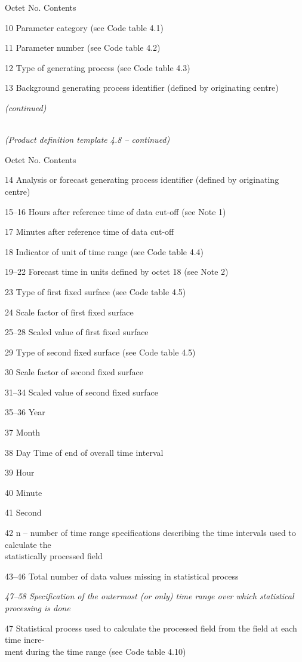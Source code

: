 Octet No. Contents

10 Parameter category (see Code table 4.1)

11 Parameter number (see Code table 4.2)

12 Type of generating process (see Code table 4.3)

13 Background generating process identifier (defined by originating centre)

\emph{(continued)}

\emph{\\
(Product definition template 4.8 -- continued)}

Octet No. Contents

14 Analysis or forecast generating process identifier (defined by originating centre)

15--16 Hours after reference time of data cut-off (see Note 1)

17 Minutes after reference time of data cut-off

18 Indicator of unit of time range (see Code table 4.4)

19--22 Forecast time in units defined by octet 18 (see Note 2)

23 Type of first fixed surface (see Code table 4.5)

24 Scale factor of first fixed surface

25--28 Scaled value of first fixed surface

29 Type of second fixed surface (see Code table 4.5)

30 Scale factor of second fixed surface

31--34 Scaled value of second fixed surface

35--36 Year

37 Month

38 Day Time of end of overall time interval

39 Hour

40 Minute

41 Second

42 n -- number of time range specifications describing the time intervals used to calculate the\\
statistically processed field

43--46 Total number of data values missing in statistical process

\emph{47--58 Specification of the outermost (or only) time range over which statistical}\\
\emph{processing is done}

47 Statistical process used to calculate the processed field from the field at each time incre-\\
ment during the time range (see Code table 4.10)

